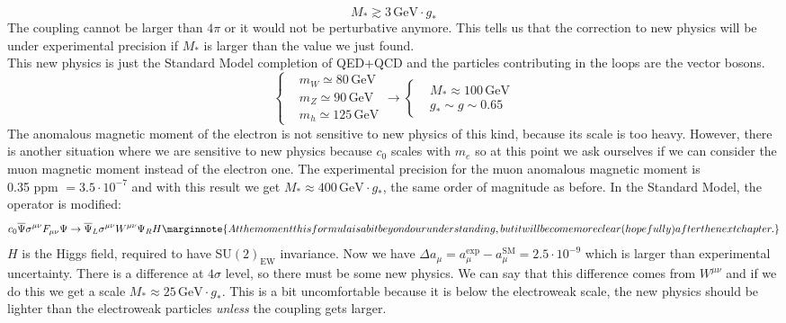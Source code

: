 \documentclass[../main.tex]{subfiles}
\begin{document}
\begin{example}
\[
M_*\gtrsim3\,\text{GeV}\cdot g_*
\]
The coupling cannot be larger than $4\pi$ or it would not be perturbative anymore. This tells us that the correction to new physics will be under experimental precision if $M_*$ is larger than the value we just found.\\
This new physics is just the Standard Model completion of QED+QCD and the particles contributing in the loops are the vector bosons.
\[
\left\{
\begin{aligned}
&m_W\simeq80\,\text{GeV}\\
&m_Z\simeq90\,\text{GeV}\\
&m_h\simeq125\,\text{GeV}
\end{aligned}
\right.
\to
\left\{
\begin{aligned}
&M_*\approx100\,\text{GeV}\\
&g_*\sim g\sim0.65
\end{aligned}
\right.
\]
The anomalous magnetic moment of the electron is not sensitive to new physics of this kind, because its scale is too heavy. However, there is another situation where we are sensitive to new physics because $c_0$ scales with $m_e$ so at this point we ask ourselves if we can consider the muon magnetic moment instead of the electron one. The experimental precision for the muon anomalous magnetic moment is\\
0.35 ppm $=3.5\cdot10^{-7}$ and with this result we get $M_*\approx400\,\text{GeV}\cdot g_*$, the same order of magnitude as before. In the Standard Model, the operator is modified:
\[
c_0\overline{\Psi}\sigma^{\mu\nu}F_{\mu\nu}\Psi\to\overline{\Psi}_L\sigma^{\mu\nu}W^{\mu\nu}\Psi_RH\marginnote{At the moment this formula is a bit beyond our understanding, but it will become more clear (hopefully) after the next chapter.}
\]
$H$ is the Higgs field, required to have SU$(2)_{\text{EW}}$ invariance. Now we have $\Delta a_\mu=a_\mu^{\text{exp}}-a_\mu^{\text{SM}}=2.5\cdot10^{-9}$ which is larger than experimental uncertainty. There is a difference at $4\sigma$ level, so there must be some new physics. We can say that this difference comes from $W^{\mu\nu}$ and if we do this we get a scale
$M_*\approx25\,\text{GeV}\cdot g_*$. This is a bit uncomfortable because it is below the electroweak scale, the new physics should be lighter than the electroweak particles \textit{unless} the coupling gets larger.
\end{example}
\end{document}
